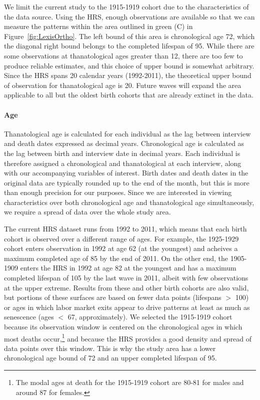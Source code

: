 \documentclass{article}
\begin{document}
We limit the current study to the 1915-1919 cohort due
to the characteristics of the data source. Using the HRS, enough
observations are available so that we can measure the patterns
within the area outlined in green (C) in Figure~\ref{fig:LexisOrtho}. The
left bound of this area is chronological age 72, which the diagonal right
bound belongs to the completed lifespan of 95. While there are some observations
at thanatological ages greater than 12, there are too few to produce reliable estimates, and this choice of upper bound is somewhat arbitrary. Since the HRS spans 20 calendar years (1992-2011), the theoretical
upper bound of observation for thanatological age is 20. Future waves will
expand the area applicable to all but the oldest birth cohorts that are already
extinct in the data.

\paragraph*{Age}
Thanatological age is calculated for each individual as the lag between
interview and death dates expressed as decimal years. Chronological age is
calculated as the lag between birth and interview date in decimal years. Each
individual is therefore assigned a chronological and thanatological at each
interview, along with our accompanying variables of interest.
Birth dates and death dates in the original data are typically rounded up to the end
of the month, but this is more than enough precision for our purposes. Since we
are interested in viewing characteristics over both chronological age and
thanatological age simultaneously, we require a spread of data over
the whole study area. 

The current HRS dataset runs from 1992 to 2011, which
means that each birth cohort is observed over a different range of ages. For
example, the 1925-1929 cohort enters observation in 1992 at age 62 (at the
youngest) and acheives a maximum completed age of 85 by the end of 2011. On the
other end, the 1905-1909 enters the HRS in 1992 at age 82 at the youngest and
has a maximum completed lifespan of 105 by the last wave in 2011, albeit with
few observations at the upper extreme. Results from these and other birth cohorts are also
valid, but portions of these surfaces are based on fewer data points (lifespans $>$ 100) or ages in which labor market
exits appear to drive patterns at least as much as senescence (ages $<$ 67,
approximately). We selected the 1915-1919 cohort because
its observation window is centered on the chronological ages in which most
deaths occur,\footnote{The modal ages at death for the 1915-1919 cohort are
80-81 for males and around 87 for females.} and because the HRS provides a good
density and spread of data points over this window. This is why the study area has a lower chronological age bound of 72 and an upper completed lifespan of 95.
\end{document}
